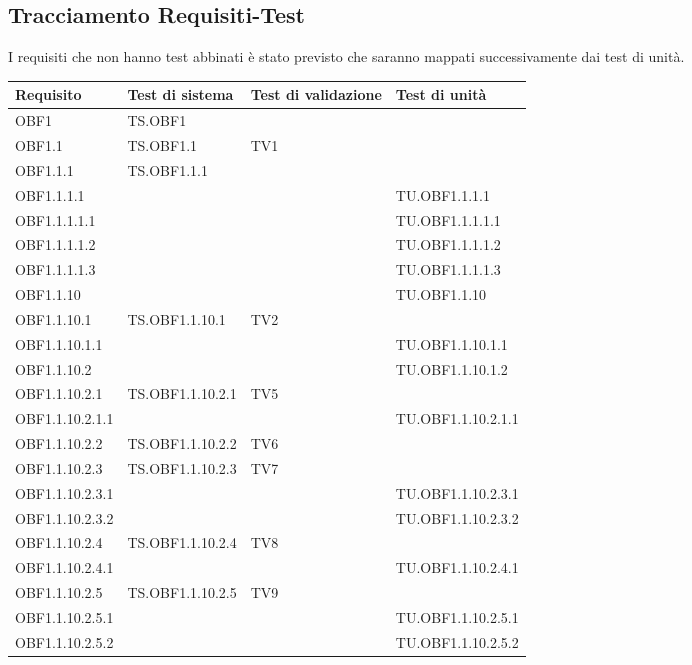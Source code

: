 \documentclass{scalatekids-article}
\begin{document}
\subsection{Tracciamento Requisiti-Test}

I requisiti che non hanno test abbinati è stato previsto che
saranno mappati successivamente dai test di unità.

\begin{longtable}[H]{|l|p{4cm}|p{4cm}|p{4cm}|}
  \hline
  \textbf{Requisito} & \textbf{Test di sistema} & \textbf{Test di validazione} & \textbf{Test di unità}\\
  \hline
  OBF1 & TS.OBF1 &  & \\
  \hline
  OBF1.1 & TS.OBF1.1 & TV1 &\\
  \hline
  OBF1.1.1 & TS.OBF1.1.1 & &\\
  \hline
  OBF1.1.1.1 & & & TU.OBF1.1.1.1\\
  \hline
  OBF1.1.1.1.1 & & & TU.OBF1.1.1.1.1\\
  \hline
  OBF1.1.1.1.2 & &  & TU.OBF1.1.1.1.2 \\
  \hline
  OBF1.1.1.1.3 & &  & TU.OBF1.1.1.1.3 \\
  \hline
  OBF1.1.10 & & & TU.OBF1.1.10 \\
  \hline
  OBF1.1.10.1 & TS.OBF1.1.10.1 & TV2  &\\
  \hline
  OBF1.1.10.1.1 & & & TU.OBF1.1.10.1.1 \\
  \hline
  OBF1.1.10.2 &  & & TU.OBF1.1.10.1.2 \\
  \hline
  OBF1.1.10.2.1 & TS.OBF1.1.10.2.1 & TV5  &\\
  \hline
  OBF1.1.10.2.1.1 & & & TU.OBF1.1.10.2.1.1\\
  \hline
  OBF1.1.10.2.2 & TS.OBF1.1.10.2.2 & TV6 &\\
  \hline
  OBF1.1.10.2.3 & TS.OBF1.1.10.2.3 & TV7 &\\
  \hline
  OBF1.1.10.2.3.1 & & & TU.OBF1.1.10.2.3.1 \\
  \hline
  OBF1.1.10.2.3.2 & & & TU.OBF1.1.10.2.3.2 \\
  \hline
  OBF1.1.10.2.4 & TS.OBF1.1.10.2.4 & TV8 &\\
  \hline
  OBF1.1.10.2.4.1 & & & TU.OBF1.1.10.2.4.1 \\
  \hline
  OBF1.1.10.2.5 & TS.OBF1.1.10.2.5 & TV9 &\\
  \hline
  OBF1.1.10.2.5.1 & & & TU.OBF1.1.10.2.5.1 \\
  \hline
  OBF1.1.10.2.5.2 & & & TU.OBF1.1.10.2.5.2 \\

\end{longtable}
\end{document}
